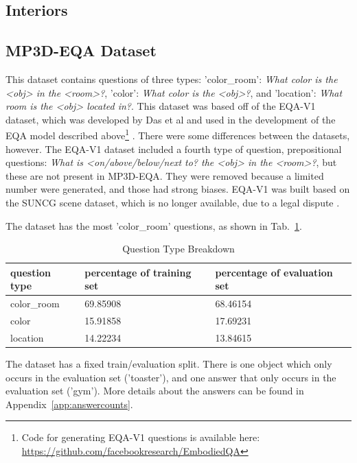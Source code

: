 
\subsection{Interiors}

\subsection{MP3D-EQA Dataset} 
This dataset contains questions of three types: 'color\_room': \emph{What color is the <obj> in the <room>?}, 'color': \emph{What color is the <obj>?}, and 'location': \emph{What room is the <obj> located in?}. This dataset was based off of the EQA-V1 dataset, which was developed by Das et al and used in the development of the EQA model described above\footnote{Code for generating EQA-V1 questions is available here: \url{https://github.com/facebookresearch/EmbodiedQA}} \cite{embodiedqa}. There were some differences between the datasets, however. The EQA-V1 dataset included a fourth type of question, prepositional questions: \emph{What is <on/above/below/next to? the <obj> in the <room>?}, but these are not present in MP3D-EQA. They were removed because a limited number were generated, and those had strong biases. %
EQA-V1 was built based on the SUNCG scene dataset, which is no longer available, due to a legal dispute \cite{planner5d}. %

The dataset has the most 'color\_room' questions, as shown in Tab.~\ref{tab:q_breakdown}.

\begin{table}[h]
\centering
\caption{Question Type Breakdown}
\begin{tabular}{ |l|l|l| }
\hline
\textbf{question type} & \textbf{percentage of training set} & \textbf{percentage of evaluation set} \\
\hline
color\_room & 69.85908 & 68.46154\\
color & 15.91858 & 17.69231\\
location & 14.22234 & 13.84615\\
\hline
\end{tabular}
\label{tab:q_breakdown}
\end{table}

The dataset has a fixed train/evaluation split. There is one object which only occurs in the evaluation set ('toaster'), and one answer that only occurs in the evaluation set ('gym'). More details about the answers can be found in Appendix~\ref{app:answercounts}.

